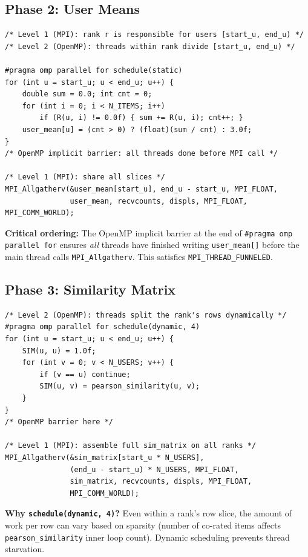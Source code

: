 \documentclass[12pt,a4paper]{article}
\begin{document}
\subsection{Phase 2: User Means}

\begin{lstlisting}
/* Level 1 (MPI): rank r is responsible for users [start_u, end_u) */
/* Level 2 (OpenMP): threads within rank divide [start_u, end_u) */

#pragma omp parallel for schedule(static)
for (int u = start_u; u < end_u; u++) {
    double sum = 0.0; int cnt = 0;
    for (int i = 0; i < N_ITEMS; i++)
        if (R(u, i) != 0.0f) { sum += R(u, i); cnt++; }
    user_mean[u] = (cnt > 0) ? (float)(sum / cnt) : 3.0f;
}
/* OpenMP implicit barrier: all threads done before MPI call */

/* Level 1 (MPI): share all slices */
MPI_Allgatherv(&user_mean[start_u], end_u - start_u, MPI_FLOAT,
               user_mean, recvcounts, displs, MPI_FLOAT, MPI_COMM_WORLD);
\end{lstlisting}

\textbf{Critical ordering:}  The OpenMP implicit barrier at the end of
\texttt{\#pragma omp parallel for} ensures \emph{all} threads have finished
writing \texttt{user\_mean[]} before the main thread calls
\texttt{MPI\_Allgatherv}.  This satisfies \texttt{MPI\_THREAD\_FUNNELED}.

\subsection{Phase 3: Similarity Matrix}

\begin{lstlisting}
/* Level 2 (OpenMP): threads split the rank's rows dynamically */
#pragma omp parallel for schedule(dynamic, 4)
for (int u = start_u; u < end_u; u++) {
    SIM(u, u) = 1.0f;
    for (int v = 0; v < N_USERS; v++) {
        if (v == u) continue;
        SIM(u, v) = pearson_similarity(u, v);
    }
}
/* OpenMP barrier here */

/* Level 1 (MPI): assemble full sim_matrix on all ranks */
MPI_Allgatherv(&sim_matrix[start_u * N_USERS],
               (end_u - start_u) * N_USERS, MPI_FLOAT,
               sim_matrix, recvcounts, displs, MPI_FLOAT,
               MPI_COMM_WORLD);
\end{lstlisting}

\textbf{Why \texttt{schedule(dynamic, 4)}?}  Even within a rank's row slice,
the amount of work per row can vary based on sparsity (number of co-rated
items affects \texttt{pearson\_similarity} inner loop count).  Dynamic
scheduling prevents thread starvation.
\end{document}
